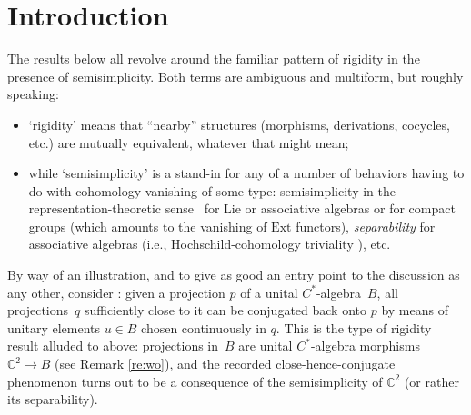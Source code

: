 \documentclass[pdftex]{sigma}
\numberwithin{equation}{section}
\newcommand\bC{{\mathbb C}}
\begin{document}

\section{Introduction}

The results below all revolve around the familiar pattern of rigidity in the presence of semisimplicity. Both terms are ambiguous and multiform, but roughly speaking:
\begin{itemize}\itemsep=0pt
\item `rigidity' means that ``nearby'' structures (morphisms, derivations, cocycles, etc.) are mutually equivalent, whatever that might mean;
\item while `semisimplicity' is a stand-in for any of a number of behaviors having to do with cohomology vanishing of some type: semisimplicity in the representation-theoretic sense~\cite[Definition~2.1]{lam} for Lie or associative algebras or for compact groups (which amounts to the vanishing of $\mathrm{Ext}$ functors), {\it separability} \cite[Section~10.2, Definition]{pierce} for associative algebras (i.e., Hochschild-cohomology triviality \cite[Section~11.5, Proposition]{pierce}), etc.
\end{itemize}

By way of an illustration, and to give as good an entry point to the discussion as any other, consider \cite[Proposition 5.2.6]{wo}: given a projection $p$ of a unital $C^*$-algebra~$B$, all projections~$q$ sufficiently close to it can be conjugated back onto $p$ by means of unitary elements $u\in B$ chosen continuously in $q$. This is the type of rigidity result alluded to above: projections in~$B$ are unital $C^*$-algebra morphisms $\bC^2\to B$ (see Remark \ref{re:wo}), and the recorded close-hence-conjugate phenomenon turns out to be a consequence of the semisimplicity of $\bC^2$ (or rather its separability).
\end{document}
